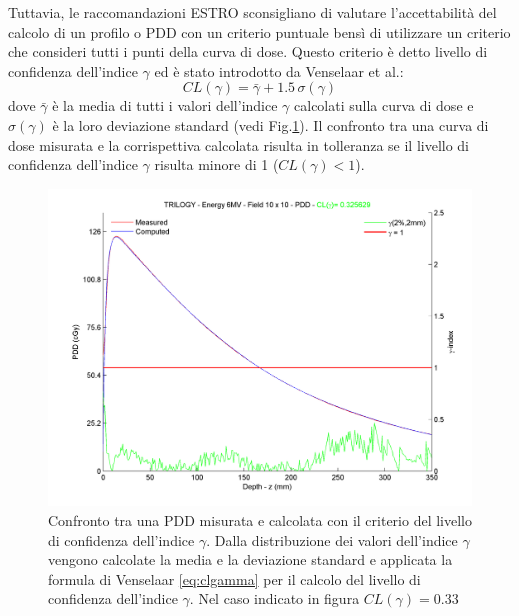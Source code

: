 Tuttavia, le raccomandazioni ESTRO sconsigliano di valutare l'accettabilità del calcolo di un profilo o PDD con un criterio puntuale bensì di utilizzare un criterio che consideri tutti i punti della curva di dose. Questo criterio è detto livello di confidenza dell'indice $\gamma$ ed è stato introdotto da Venselaar et al.\cite{Venselaar2001}:
\begin{equation}
CL(\gamma) = \bar{\gamma} + 1.5\,\sigma(\gamma)
\label{eq:clgamma}
\end{equation}
dove $\bar{\gamma}$ è la media di tutti i valori dell'indice $\gamma$ calcolati sulla curva di dose e $\sigma(\gamma)$ è la loro deviazione standard (vedi Fig.\ref{fig:gamma10x10}).
Il confronto tra una curva di dose misurata e la corrispettiva calcolata risulta in tolleranza se il livello di confidenza dell'indice $\gamma$ risulta minore di 1 ($CL(\gamma) < 1$).
\begin{figure}[!t]
\centering
\includegraphics[width=.9\textwidth]{./cap2/pdd10x10.png}
\caption{Confronto tra una PDD misurata e calcolata con il criterio del livello di confidenza dell'indice $\gamma$. Dalla distribuzione dei valori dell'indice $\gamma$ vengono calcolate la media e la deviazione standard e applicata la formula di Venselaar \eqref{eq:clgamma} per il calcolo del livello di confidenza dell'indice $\gamma$. Nel caso indicato in figura $CL(\gamma)=0.33$}
\label{fig:gamma10x10}
\end{figure}

